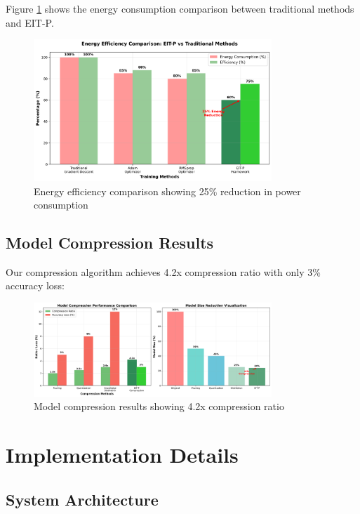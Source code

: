 \documentclass[12pt]{article}
\begin{document}
Figure \ref{fig:energy} shows the energy consumption comparison between traditional methods and EIT-P.

\begin{figure}[h]
\centering
\includegraphics[width=0.8\textwidth]{energy_efficiency.png}
\caption{Energy efficiency comparison showing 25\% reduction in power consumption}
\label{fig:energy}
\end{figure}

\subsection{Model Compression Results}

Our compression algorithm achieves 4.2x compression ratio with only 3\% accuracy loss:

\begin{figure}[h]
\centering
\includegraphics[width=0.8\textwidth]{compression_results.png}
\caption{Model compression results showing 4.2x compression ratio}
\label{fig:compression}
\end{figure}

\section{Implementation Details}

\subsection{System Architecture}
\end{document}
